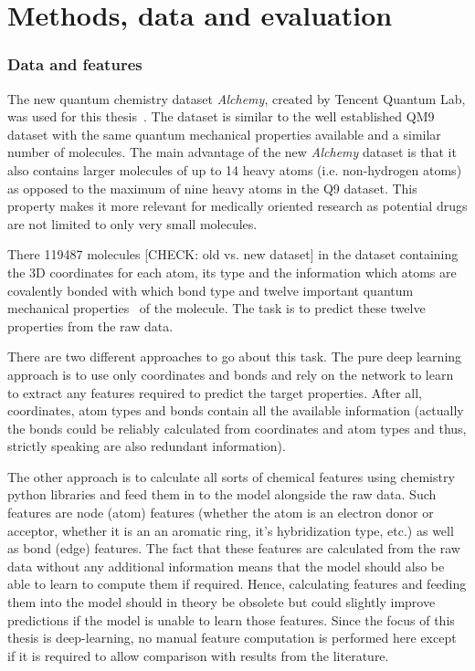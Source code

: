 \chapter{Methods, data and evaluation}
\label{chapter:Methods}


\subsection{Data and features}

The new quantum chemistry dataset \textit{Alchemy}, created by Tencent Quantum Lab, was used for this thesis~\cite{Chen2019}. The dataset is similar to the well established QM9 dataset with the same quantum mechanical properties available and a similar number of molecules. The main advantage of the new \textit{Alchemy} dataset is that it also contains larger molecules of up to 14 heavy atoms (i.e. non-hydrogen atoms) as opposed to the maximum of nine heavy atoms in the Q9 dataset. This property makes it more relevant for medically oriented research as potential drugs are not limited to only very small molecules.

There 119487 molecules [CHECK: old vs. new dataset] in the dataset containing the 3D coordinates for each atom, its type and the information which atoms are covalently bonded with which bond type and twelve important quantum mechanical properties~\cite{Chen2019} of the molecule. The task is to predict these twelve properties from the raw data.

There are two different approaches to go about this task. The pure deep learning approach is to use only coordinates and bonds and rely on the network to learn to extract any features required to predict the target properties. After all, coordinates, atom types and bonds contain all the available information (actually the bonds could be reliably calculated from coordinates and atom types and thus, strictly speaking are also redundant information).

The other approach is to calculate all sorts of chemical features using chemistry python libraries and feed them in to the model alongside the raw data. Such features are node (atom) features (whether the atom is an electron donor or acceptor, whether it is an an aromatic ring, it's hybridization type, etc.) as well as bond (edge) features. The fact that these features are calculated from the raw data without any additional information means that the model should also be able to learn to compute them if required. Hence, calculating features and feeding them into the model should in theory be obsolete but could slightly improve predictions if the model is unable to learn those features. Since the focus of this thesis is deep-learning, no manual feature computation is performed here except if it is required to allow comparison with results from the literature.



